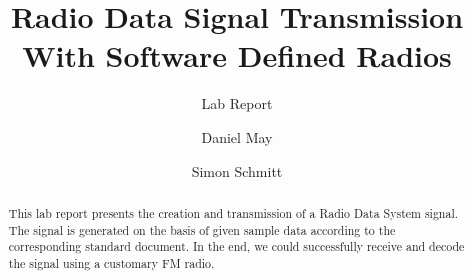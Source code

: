 \documentclass[sigconf]{acmart}
\begin{document}
\title{Radio Data Signal Transmission With Software Defined Radios}

\subtitle{Lab Report}



\author{Daniel May}
\author{Simon Schmitt}

\renewcommand{\shortauthors}{Daniel May \& Simon Schmitt}


\begin{abstract}
%
%  
This lab report presents the creation and transmission of a Radio Data System signal.
The signal is generated on the basis of given sample data according to the corresponding
standard document. In the end, we could successfully receive and decode the signal
using a customary FM radio.


\end{abstract}
\end{document}
